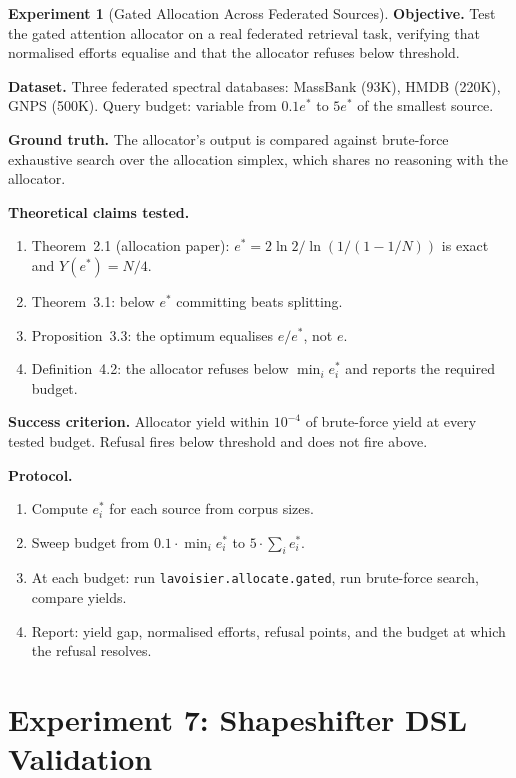 \documentclass[11pt,a4paper]{article}
\theoremstyle{planstyle}
\theoremstyle{definition}
\newtheorem{experiment}[theorem]{Experiment}
\theoremstyle{remark}
\newcommand{\estar}{e^{*}}
\newcommand{\shk}[1]{\texttt{#1}}
\begin{document}
\begin{experiment}[Gated Allocation Across Federated Sources]
\label{exp:federated}
\textbf{Objective.} Test the gated attention allocator on a real
federated retrieval task, verifying that normalised efforts equalise
and that the allocator refuses below threshold.

\textbf{Dataset.} Three federated spectral databases: MassBank (93K),
HMDB (220K), GNPS (500K). Query budget: variable from $0.1\estar$ to
$5\estar$ of the smallest source.

\textbf{Ground truth.} The allocator's output is compared against
brute-force exhaustive search over the allocation simplex, which shares
no reasoning with the allocator.

\textbf{Theoretical claims tested.}
\begin{enumerate}[nosep,label=(\roman*)]
\item Theorem~2.1 (allocation paper): $\estar = 2\ln 2 / \ln(1/(1-1/N))$
  is exact and $Y(\estar) = N/4$.
\item Theorem~3.1: below $\estar$ committing beats splitting.
\item Proposition~3.3: the optimum equalises $e/\estar$, not $e$.
\item Definition~4.2: the allocator refuses below $\min_i \estar_i$ and
  reports the required budget.
\end{enumerate}

\textbf{Success criterion.} Allocator yield within $10^{-4}$ of
brute-force yield at every tested budget. Refusal fires below threshold
and does not fire above.

\textbf{Protocol.}
\begin{enumerate}[nosep]
\item Compute $\estar_i$ for each source from corpus sizes.
\item Sweep budget from $0.1 \cdot \min_i \estar_i$ to $5 \cdot \sum_i \estar_i$.
\item At each budget: run \shk{lavoisier.allocate.gated}, run
  brute-force search, compare yields.
\item Report: yield gap, normalised efforts, refusal points, and
  the budget at which the refusal resolves.
\end{enumerate}
\end{experiment}

\section{Experiment 7: Shapeshifter DSL Validation}
\label{sec:exp-dsl}
\end{document}
